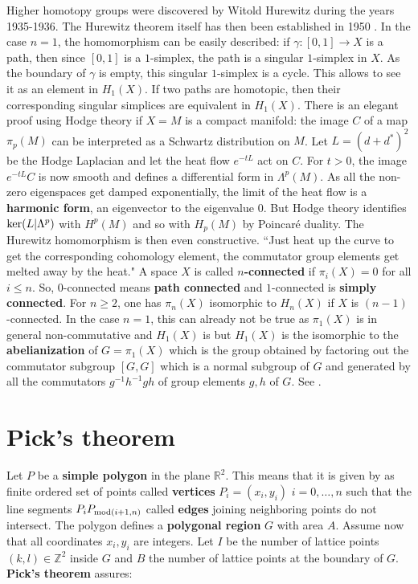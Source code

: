 \documentclass[12pt]{amsart}
\begin{document}
Higher homotopy groups were discovered by Witold Hurewitz during the years 1935-1936.
The Hurewitz theorem itself has then been established in 1950 \cite{Hurewicz}. In the case $n=1$,
the homomorphism can be easily described: if $\gamma: [0,1] \to X$ is a path, then since $[0,1]$
is a $1$-simplex, the path is a singular $1$-simplex in $X$. As the boundary of $\gamma$ is empty,
this singular $1$-simplex is a cycle. This allows to see it as an element in $H_1(X)$. If two
paths are homotopic, then their corresponding singular simplices are equivalent in $H_1(X)$.
There is an elegant proof using Hodge theory if $X=M$ is a compact manifold: the image $C$ of a map
$\pi_p(M)$ can be interpreted as a Schwartz distribution on $M$. Let $L=(d+d^*)^2$ be the Hodge
Laplacian and let the heat flow $e^{-t L}$ act on $C$. For $t>0$, the image $e^{-t L} C$ is now
smooth and defines a differential form in $\Lambda^p(M)$. As all the non-zero eigenspaces get damped
exponentially, the limit of the heat flow is a {\bf harmonic form}, an eigenvector to the 
eigenvalue $0$. But Hodge theory identifies ${\rm ker}(L|\Lambda^p)$ with $H^p(M)$ and so with 
$H_p(M)$ by Poincar\'e duality. The Hurewitz homomorphism is then even constructive. ``Just heat up the curve to get 
the corresponding cohomology element, the commutator group elements get melted away by the heat."
A space $X$ is called {\bf $n$-connected} if $\pi_i(X)=0$ for all $i \leq n$. So, 
$0$-connected means {\bf path connected} and $1$-connected is {\bf simply connected}.
For $n \geq 2$, one has $\pi_n(X)$ isomorphic to $H_n(X)$ if $X$ is $(n-1)$-connected. 
In the case $n=1$, this can already not be true as $\pi_1(X)$ is in 
general non-commutative and $H_1(X)$ is but $H_1(X)$ is the isomorphic to the {\bf abelianization}
of $G=\pi_1(X)$ which is the group obtained by factoring out the commutator subgroup $[G,G]$
which is a normal subgroup of $G$ and generated by all the commutators $g^{-1} h^{-1} g h$ 
of group elements $g,h$ of $G$. See \cite{Hatcher}.

\section{Pick's theorem}

Let $P$ be a {\bf simple polygon} in the plane $\mathbb{R}^2$. This means
that it is given by as finite ordered set of points called {\bf vertices} $P_i=(x_i,y_i)$
$i=0,\dots,n$ such that the line segments $P_i P_{{\rm mod}(i+1,n)}$ 
called {\bf edges} joining neighboring points do not intersect. 
The polygon defines a {\bf polygonal region} $G$ with
area $A$. Assume now that all coordinates $x_i,y_i$ are integers. Let $I$ be the number
of lattice points $(k,l) \in \mathbb{Z}^2$ inside $G$ and $B$ the number
of lattice points at the boundary of $G$. {\bf Pick's theorem} assures:
\end{document}
